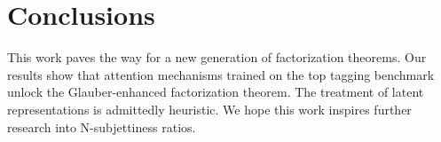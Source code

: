 \section{Conclusions}\label{sec:conclusions}

This work paves the way for a new generation of factorization theorems.
Our results show that attention mechanisms trained on the top tagging
benchmark unlock the Glauber-enhanced factorization theorem. The
treatment of latent representations is admittedly heuristic. We hope
this work inspires further research into N-subjettiness ratios.


